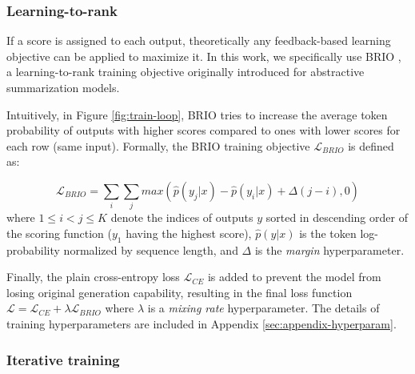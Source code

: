 


\subsubsection{Learning-to-rank}

If a score is assigned to each output, theoretically any feedback-based learning objective \citep{mrt, ppo, ppr} can be applied to maximize it. In this work, we specifically use BRIO \citep{brio}, a learning-to-rank training objective originally introduced for abstractive summarization models.

Intuitively, in Figure \ref{fig:train-loop}, BRIO tries to increase the average token probability of outputs with higher scores compared to ones with lower scores for each row (same input). Formally, the BRIO training objective $\mathcal{L}_{BRIO}$ is defined as:

\small\[
\mathcal{L}_{BRIO} = \sum_{i}\sum_{j}max(\hat{p}(y_j|x) - \hat{p}(y_i|x) + \Delta(j-i), 0)
\]\normalsize
where $1 \leq i < j \leq K$ denote the indices of outputs $y$ sorted in descending order of the scoring function ($y_1$ having the highest score), $\hat{p}(y|x)$ is the token log-probability normalized by sequence length, and $\Delta$ is the \textit{margin} hyperparameter.

Finally, the plain cross-entropy loss $\mathcal{L}_{CE}$ is added to prevent the model from losing original generation capability, resulting in the final loss function $\mathcal{L} = \mathcal{L}_{CE} + \lambda\mathcal{L}_{BRIO}$ where $\lambda$ is a \textit{mixing rate} hyperparameter. The details of training hyperparameters are included in Appendix \ref{sec:appendix-hyperparam}.

\subsubsection{Iterative training}

